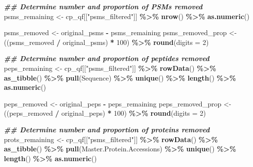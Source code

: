 \documentclass[9pt,a4paper,]{extarticle}
\newenvironment{Shaded}{\begin{snugshade}}{\end{snugshade}}
\newcommand{\AttributeTok}[1]{\textcolor[rgb]{0.13,0.29,0.53}{#1}}
\newcommand{\DecValTok}[1]{\textcolor[rgb]{0.00,0.00,0.81}{#1}}
\newcommand{\DocumentationTok}[1]{\textcolor[rgb]{0.56,0.35,0.01}{\textbf{\textit{#1}}}}
\newcommand{\FunctionTok}[1]{\textcolor[rgb]{0.13,0.29,0.53}{\textbf{#1}}}
\newcommand{\NormalTok}[1]{#1}
\newcommand{\OtherTok}[1]{\textcolor[rgb]{0.56,0.35,0.01}{#1}}
\newcommand{\SpecialCharTok}[1]{\textcolor[rgb]{0.81,0.36,0.00}{\textbf{#1}}}
\newcommand{\StringTok}[1]{\textcolor[rgb]{0.31,0.60,0.02}{#1}}
\begin{document}
\begin{Shaded}
\begin{Highlighting}[]
\DocumentationTok{\#\# Determine number and proportion of PSMs removed}
\NormalTok{psms\_remaining }\OtherTok{\textless{}{-}}\NormalTok{ cp\_qf[[}\StringTok{"psms\_filtered"}\NormalTok{]] }\SpecialCharTok{\%\textgreater{}\%}
  \FunctionTok{nrow}\NormalTok{() }\SpecialCharTok{\%\textgreater{}\%}
  \FunctionTok{as.numeric}\NormalTok{()}

\NormalTok{psms\_removed }\OtherTok{\textless{}{-}}\NormalTok{ original\_psms }\SpecialCharTok{{-}}\NormalTok{ psms\_remaining}
\NormalTok{psms\_removed\_prop }\OtherTok{\textless{}{-}}\NormalTok{ ((psms\_removed }\SpecialCharTok{/}\NormalTok{ original\_psms) }\SpecialCharTok{*} \DecValTok{100}\NormalTok{) }\SpecialCharTok{\%\textgreater{}\%}
  \FunctionTok{round}\NormalTok{(}\AttributeTok{digits =} \DecValTok{2}\NormalTok{)}

\DocumentationTok{\#\# Determine number and proportion of peptides removed}
\NormalTok{peps\_remaining }\OtherTok{\textless{}{-}}\NormalTok{ cp\_qf[[}\StringTok{"psms\_filtered"}\NormalTok{]] }\SpecialCharTok{\%\textgreater{}\%}
  \FunctionTok{rowData}\NormalTok{() }\SpecialCharTok{\%\textgreater{}\%} 
  \FunctionTok{as\_tibble}\NormalTok{() }\SpecialCharTok{\%\textgreater{}\%} 
  \FunctionTok{pull}\NormalTok{(Sequence) }\SpecialCharTok{\%\textgreater{}\%} 
  \FunctionTok{unique}\NormalTok{() }\SpecialCharTok{\%\textgreater{}\%}
  \FunctionTok{length}\NormalTok{() }\SpecialCharTok{\%\textgreater{}\%}
  \FunctionTok{as.numeric}\NormalTok{()}

\NormalTok{peps\_removed }\OtherTok{\textless{}{-}}\NormalTok{ original\_peps }\SpecialCharTok{{-}}\NormalTok{ peps\_remaining}
\NormalTok{peps\_removed\_prop }\OtherTok{\textless{}{-}}\NormalTok{ ((peps\_removed }\SpecialCharTok{/}\NormalTok{ original\_peps) }\SpecialCharTok{*} \DecValTok{100}\NormalTok{) }\SpecialCharTok{\%\textgreater{}\%}
  \FunctionTok{round}\NormalTok{(}\AttributeTok{digits =} \DecValTok{2}\NormalTok{)}

\DocumentationTok{\#\# Determine number and proportion of proteins removed}
\NormalTok{prots\_remaining }\OtherTok{\textless{}{-}}\NormalTok{ cp\_qf[[}\StringTok{"psms\_filtered"}\NormalTok{]] }\SpecialCharTok{\%\textgreater{}\%} 
  \FunctionTok{rowData}\NormalTok{() }\SpecialCharTok{\%\textgreater{}\%} 
  \FunctionTok{as\_tibble}\NormalTok{() }\SpecialCharTok{\%\textgreater{}\%} 
  \FunctionTok{pull}\NormalTok{(Master.Protein.Accessions) }\SpecialCharTok{\%\textgreater{}\%} 
  \FunctionTok{unique}\NormalTok{() }\SpecialCharTok{\%\textgreater{}\%}
  \FunctionTok{length}\NormalTok{() }\SpecialCharTok{\%\textgreater{}\%}
  \FunctionTok{as.numeric}\NormalTok{() }


\end{Highlighting}
\end{Shaded}
\end{document}
